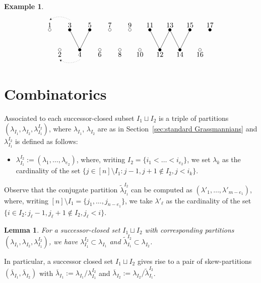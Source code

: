 \documentclass{amsart}
\newtheorem{example}[theorem]{Example}
\newtheorem{lemma}[theorem]{Lemma}
\numberwithin{equation}{section}
\begin{document}
\begin{example}
\[      \]
      \[
        \begin{tikzpicture}
          \draw[dotted,-stealth] (1.5,1.5) to[out=150,in=30] (0.5,1.5);
          \draw[dotted,-stealth] (2,-0.5) to[out=210,in=-30] (1,-0.5);
          \foreach \i in {3,5,11,13,15,17}{
            \draw[fill=black] (0.5*\i,1) circle (2pt);
            \node[above] at (0.5*\i,1) {\i};}
          \foreach \i in {1,7,9}{
            \draw[fill=white] (0.5*\i,1) circle (2pt);
            \node[above] at (0.5*\i,1) {\i};}
          \foreach \i in {4,12,14}{
            \draw[fill=black] (0.5*\i,0) circle (2pt);
            \draw (0.5*\i,0) -- (0.5*\i-0.5,1);
            \draw (0.5*\i,0) -- (0.5*\i+0.5,1);
            \node[below] at (0.5*\i,0) {\i};}
          \foreach \i in {2,6,8,10,16}{
            \draw[fill=white] (0.5*\i,0) circle (2pt);
            \node[below] at (0.5*\i,0) {\i};}
        \end{tikzpicture}
      \]

    \end{example}


\section{Combinatorics}
  Associated to each successor-closed subset $I_1\sqcup I_2$ is a triple of partitions $(\lambda_{I_1},\lambda_{I_2},\lambda_{I_1}^{I_2})$, where $\lambda_{I_1}$, $\lambda_{I_2}$ are as in Section~\ref{sec:standard Grassmannians} and $\lambda_{I_1}^{I_2}$ is defined as follows:
  \begin{itemize}
    \item $\lambda_{I_1}^{I_2}:=(\lambda_1,\ldots,\lambda_{e_2})$, where, writing $I_2=\{i_1<\ldots<i_{e_2}\}$, we set $\lambda_k$ as the cardinality of the set $\{j\in[n]\setminus I_1:j-1,j+1\notin I_2,j<i_k\}$.
  \end{itemize}
  Observe that the conjugate partition $\tilde{\lambda}_{I_1}^{I_2}$ can be computed as $(\lambda'_1,\ldots,\lambda'_{m-e_1})$, where, writing $[n]\setminus I_1=\{j_1,\ldots,j_{n-e_1}\}$, we take $\lambda'_\ell$ as the cardinality of the set $\{i\in I_2:j_\ell-1,j_\ell+1\notin I_2,j_\ell<i\}$.
  \begin{lemma}
    For a successor-closed set $I_1\sqcup I_2$ with corresponding partitions $(\lambda_{I_1},\lambda_{I_2},\lambda_{I_1}^{I_2})$, we have $\lambda_{I_1}^{I_2}\subset\lambda_{I_1}$ and $\tilde{\lambda}_{I_1}^{I_2}\subset\lambda_{I_2}$.
  \end{lemma}
  In particular, a successor closed set $I_1\sqcup I_2$ gives rise to a pair of skew-partitions $(\overline{\lambda}_{I_1},\overline{\lambda}_{I_2})$ with $\overline{\lambda}_{I_1}:=\lambda_{I_1}/\lambda_{I_1}^{I_2}$ and $\overline{\lambda}_{I_2}:=\lambda_{I_2}/\tilde{\lambda}_{I_1}^{I_2}$.
\end{document}
